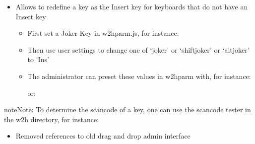 \documentclass[letterpaper,10pt,english]{sphinxmanual}
\begin{document}
\begin{itemize}
\item {} 
Allows to redefine a key as the Insert key for keyboards that do not have an Insert key
\begin{itemize}
\item {} 
First set a Joker Key in w2hparm.js, for instance:

\begin{sphinxVerbatim}[commandchars=\\\{\}]
            
\end{sphinxVerbatim}

\item {} 
Then use user settings to change one of ‘joker’ or ‘shiftjoker’ or ‘altjoker’ to ‘Ins’

\item {} 
The administrator can preset these values in w2hparm with, for instance:

\begin{sphinxVerbatim}[commandchars=\\\{\}]
  
\end{sphinxVerbatim}

or:

\begin{sphinxVerbatim}[commandchars=\\\{\}]
  
\end{sphinxVerbatim}

\end{itemize}

\end{itemize}

\begin{sphinxadmonition}{note}{Note:}
To determine the scancode of a key, one can use the scancode tester in the w2h directory, for instance: 
\end{sphinxadmonition}

\begin{itemize}
\item {} 
Removed references to old drag and drop admin interface

\end{itemize}
\end{document}
